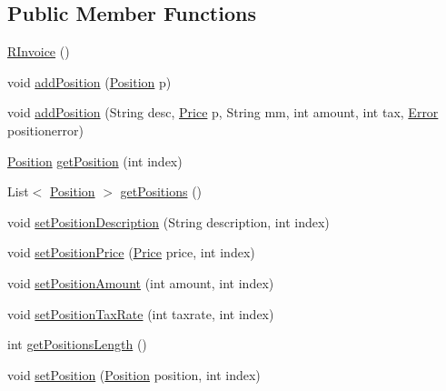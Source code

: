 \subsection*{Public Member Functions}
\begin{DoxyCompactItemize}
\item 
\hyperlink{class_reduced_invoice_1_1_r_invoice_a382c34ce7698a3e5cc9301c8cc3a5828}{R\+Invoice} ()
\item 
void \hyperlink{class_reduced_invoice_1_1_r_invoice_ae51bf96a9fc6c76ba5d79a813f4a1da0}{add\+Position} (\hyperlink{class_reduced_invoice_1_1_position}{Position} p)
\item 
void \hyperlink{class_reduced_invoice_1_1_r_invoice_ac851aecb0cdd4da309d203f0dfc4b55f}{add\+Position} (String desc, \hyperlink{class_reduced_invoice_1_1_price}{Price} p, String mm, int amount, int tax, \hyperlink{enum_reduced_invoice_1_1_a_invoice_1_1_error}{Error} positionerror)
\item 
\hyperlink{class_reduced_invoice_1_1_position}{Position} \hyperlink{class_reduced_invoice_1_1_r_invoice_a552d88c5808181f8fe3ca72772b5aff6}{get\+Position} (int index)
\item 
List$<$ \hyperlink{class_reduced_invoice_1_1_position}{Position} $>$ \hyperlink{class_reduced_invoice_1_1_r_invoice_a55b11262453617b33490afbc040761f6}{get\+Positions} ()
\item 
void \hyperlink{class_reduced_invoice_1_1_r_invoice_ab9c5e05457fa8a64a6ffcd8d6261e2a0}{set\+Position\+Description} (String description, int index)
\item 
void \hyperlink{class_reduced_invoice_1_1_r_invoice_a9c47d95997895b056a0e84741313dc0a}{set\+Position\+Price} (\hyperlink{class_reduced_invoice_1_1_price}{Price} price, int index)
\item 
void \hyperlink{class_reduced_invoice_1_1_r_invoice_ac463aa248993dd296ba9ea81356726b4}{set\+Position\+Amount} (int amount, int index)
\item 
void \hyperlink{class_reduced_invoice_1_1_r_invoice_a7b553ca5131f6059b022f9815be42c17}{set\+Position\+Tax\+Rate} (int taxrate, int index)
\item 
int \hyperlink{class_reduced_invoice_1_1_r_invoice_a3df22a621cc8ed79efa13bcb6284cadc}{get\+Positions\+Length} ()
\item 
void \hyperlink{class_reduced_invoice_1_1_r_invoice_a263bac524d7b762b58c124def1a20325}{set\+Position} (\hyperlink{class_reduced_invoice_1_1_position}{Position} position, int index)
\end{DoxyCompactItemize}
